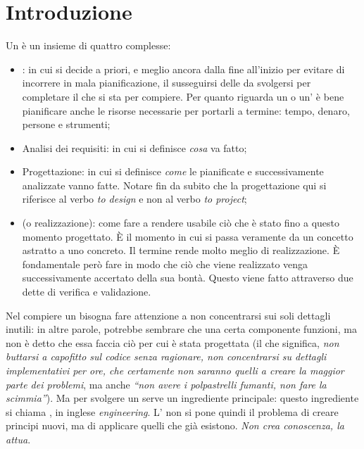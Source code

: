 \documentclass[../main]{subfiles}
\begin{document}
\section{Introduzione}
Un  è un insieme di quattro  complesse:
\begin{itemize}
    \item {}:  in cui si decide a priori, e meglio ancora dalla fine all’inizio per evitare di incorrere in mala pianificazione, il susseguirsi delle  da svolgersi per completare il  che si sta per compiere. Per quanto riguarda un  o un’ è bene pianificare anche le risorse necessarie per portarli a termine: tempo, denaro, persone e strumenti;
    \item Analisi dei requisiti:  in cui si definisce \textit{cosa} va fatto;
    \item Progettazione:  in cui si definisce \textit{come} le  pianificate e successivamente analizzate vanno fatte. Notare fin da subito che la progettazione qui si riferisce al verbo \textit{to design} e non al verbo \textit{to project};
    \item {} (o realizzazione): come fare a rendere usabile ciò che è stato fino a questo momento progettato. È il momento in cui si passa veramente da un concetto astratto a uno concreto. Il termine  rende molto meglio di realizzazione. È fondamentale però fare in modo che ciò che viene realizzato venga successivamente accertato della sua bontà. Questo viene fatto attraverso due  dette di verifica e validazione.
\end{itemize}
Nel compiere un  bisogna fare attenzione a non concentrarsi sui soli dettagli inutili: in altre parole, potrebbe sembrare che una certa componente funzioni, ma non è detto che essa faccia ciò per cui è stata progettata (il che significa, \textit{non buttarsi a capofitto sul codice senza ragionare, non concentrarsi su dettagli implementativi per ore, che certamente non saranno quelli a creare la maggior parte dei problemi}, ma anche \textit{“non avere i polpastrelli fumanti, non fare la scimmia”}).\newline\newline
Ma per svolgere un  serve un ingrediente principale: questo ingrediente si chiama , in inglese \textit{engineering}. L’ non si pone quindi il problema di creare principi nuovi, ma di applicare quelli che già esistono. \textit{Non crea conoscenza, la attua}.\newline\newline
\end{document}
